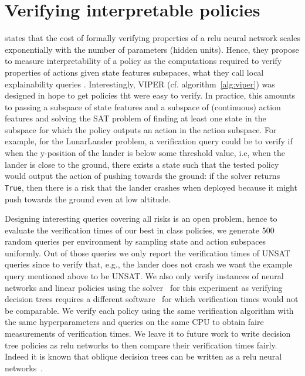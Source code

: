 \section{Verifying interpretable policies}\label{sec:verif}
\cite{lens-complexity} states that the cost of formally verifying properties of a relu neural network scales exponentially with the number of parameters (hidden units).
Hence, they propose to measure interpretability of a policy as the computations required to verify properties of actions given state features subspaces, what they call local explainability queries \cite{query}.
Interestingly, VIPER (cf. algorithm~\ref{alg:viper}) was designed in hope to get policies tht were easy to verify.
In practice, this amounts to passing a subspace of state features and a subspace of (continuous) action features and solving the SAT problem of finding at least one state in the subspace for which the policy outputs an action in the action subspace.
For example, for the LunarLander problem, a verification query could be to verify if when the y-position of the lander is below some threshold value, i.e, when the lander is close to the ground, there exists a state such that the tested policy would output the action of pushing towards the ground: if the solver returns \texttt{True}, then there is a risk that the lander crashes when deployed because it might push towards the ground even at low altitude.

Designing interesting queries covering all risks is an open problem, hence to evaluate the verification times of our best in class policies, we generate 500 random queries per environment by sampling state and action subspaces uniformly.
Out of those queries we only report the verification times of UNSAT queries since to verify that, e.g., the lander does not crash we want the example query mentioned above to be UNSAT.
We also only verify instances of neural networks and linear policies using the solver~\cite{maraboupy} for this experiment as verifying decision trees requires a different software~\cite{z3} for which verification times would not be comparable.
We verify each policy using the same verification algorithm with the same hyperparameters and queries on the same CPU to obtain faire measurements of verification times.
We leave it to future work to write decision tree policies as relu networks to then compare their verification times fairly.
Indeed it is known that oblique decision trees can be written as a relu neural networks~\cite{Lee2020Oblique}.

